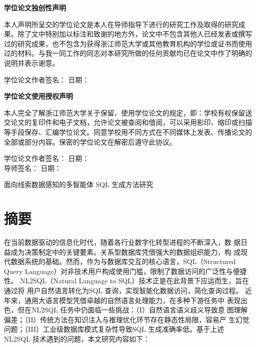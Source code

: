 \documentclass[12pt,a4paper,openright,UTF8]{ctexbook}
\begin{document}
\newpage
\thispagestyle{empty}
\begin{center}
    {\bfseries 学位论文独创性声明}
\end{center}
\vspace{1cm}
本人声明所呈交的学位论文是本人在导师指导下进行的研究工作及取得的研究成果。除了文中特别加以标注和致谢的地方外，论文中不包含其他人已经发表或撰写过的研究成果，也不包含为获得浙江师范大学或其他教育机构的学位或证书而使用过的材料。与我一同工作的同志对本研究所做的任何贡献均已在论文中作了明确的说明并表示谢意。
\vspace{2cm}
\begin{flushright}
    学位论文作者签名：\underline{\hspace{4cm}} \quad 日期：\underline{\hspace{3cm}}
\end{flushright}

\newpage
\thispagestyle{empty}
\begin{center}
    {\bfseries 学位论文使用授权声明}
\end{center}
\vspace{1cm}
本人完全了解浙江师范大学关于保留、使用学位论文的规定，即：学校有权保留送交论文的复印件和电子文档，允许论文被查阅和借阅，可以采用影印、缩印或扫描等手段保存、汇编学位论文。同意学校用不同方式在不同媒体上发表、传播论文的全部或部分内容。保密的学位论文在解密后遵守此协议。
\vspace{2cm}
\begin{flushright}
    学位论文作者签名：\underline{\hspace{4cm}} \quad 日期：\underline{\hspace{3cm}} \\[1cm]
    导师签名：\underline{\hspace{4.6cm}} \quad 日期：\underline{\hspace{3cm}}
\end{flushright}

\newpage
{}
\setcounter{page}{1}
\tableofcontents
\newpage
{}
\setcounter{page}{1}

面向线索数据感知的多智能体 SQL 生成方法研究

\chapter*{摘\quad 要}

在当前数据驱动的信息化时代，随着各行业数字化转型进程的不断深入，数 据日益成为决策制定中的关键要素。关系型数据库凭借强大的数据组织能力，构 成现代数据系统的基础。然而，作为与数据库交互的核心语言，SQL（Structured Query Language）对非技术用户构成使用门槛，限制了数据访问的广泛性与便捷性。 NL2SQL（Natural Language to SQL）技术正是在此背景下应运而生，旨在通过将 用户自然语言转化为SQL 查询，实现智能化数据访问，简化查询过程。 近年来，通用大语言模型凭借卓越的自然语言处理能力，在多种下游任务中 表现出色，但在NL2SQL 任务中仍面临一些挑战：（I）自然语言语义歧义导致意 图理解偏差；（II）传统方法在知识注入与推理优化环节存在静态性局限，容易产 生幻觉问题；（III）工业级数据库模式复杂性导致SQL 生成准确率低。基于上述 NL2SQL 技术遇到的问题，本文研究内容如下：
\end{document}
